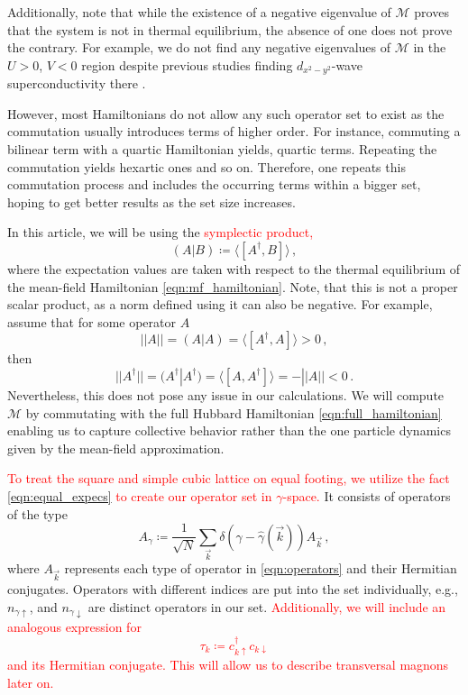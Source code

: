 \documentclass[
    reprint, 
    aps,
    preprintnumbers,
    twocolumn,
    prb,
    superscriptaddress
]{revtex4-2}
\newcommand{\vk}{\vec{k}}
\newcommand{\up}{\uparrow}
\newcommand{\down}{\downarrow}
\newcommand{\mM}{\mathcal{M}}
\begin{document}
Additionally, note that while the existence of a negative eigenvalue of $\mM$ proves that the system is not in thermal equilibrium, the absence of one does not prove the contrary.
For example, we do not find any negative eigenvalues of $\mM$ in the $U>0$, $V<0$ region despite previous studies finding $d_{x^2 - y^2}$-wave superconductivity there \cite{Micnas88b,Huang13}.

However, most Hamiltonians do not allow any such operator set to exist as the commutation usually introduces terms of higher order.
For instance, commuting a bilinear term with a quartic Hamiltonian yields, quartic terms. Repeating the commutation yields hexartic ones and so on.
Therefore, one repeats this commutation process and includes the occurring terms within a bigger set,
hoping to get better results as the set size increases.

In this article, we will be using the \textcolor{red}{symplectic product,}
\begin{equation}
\label{eqn:scalar_product}
    (A | B) \coloneqq  \langle [A^\dagger, B] \rangle\,,
\end{equation}
where the expectation values are taken with respect to the thermal equilibrium of the mean-field Hamiltonian \eqref{eqn:mf_hamiltonian}.
Note, that this is not a proper scalar product, as a norm defined using it can also be negative.
For example, assume that for some operator $A$
\begin{equation}
    ||A|| = (A | A) = \langle [A^\dagger, A] \rangle > 0\,,
\end{equation}
then
\begin{equation}
    ||A^\dagger|| = (A^\dagger | A^\dagger) = \langle [A, A^\dagger] \rangle = - ||A|| < 0\,.
\end{equation}
Nevertheless, this does not pose any issue in our calculations.
We will compute $\mM$ by commutating with the full Hubbard Hamiltonian \eqref{eqn:full_hamiltonian} enabling us to capture collective behavior rather than the one particle dynamics given by the mean-field approximation.

\textcolor{red}{To treat the square and simple cubic lattice on equal footing, we utilize the fact \eqref{eqn:equal_expecs} to create our operator set in $\gamma$-space.}
It consists of operators of the type
\begin{equation}
    \label{eqn:ieom_basis_operator}
    A_\gamma \coloneqq \frac{1}{\sqrt{N}} \sum_{\vk} \delta (\gamma - \hat{\gamma}( \vk )) A_{\vk}\,,
\end{equation}
where $A_{\vk}$ represents each type of operator in \eqref{eqn:operators} and their Hermitian conjugates.
Operators with different indices are put into the set individually, e.g., $n_{\gamma \up}$, and $n_{\gamma \down}$ are distinct operators in our set.
\textcolor{red}{Additionally, we will include an analogous expression for
\begin{equation}
    \tau_{k} \coloneqq c_{k \uparrow}^\dagger c_{k \downarrow}
\end{equation}
and its Hermitian conjugate.
This will allow us to describe transversal magnons later on.}
\end{document}
